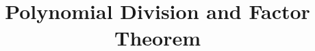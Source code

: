 \documentclass[a4paper,12pt]{article}
\begin{document}

\title{Polynomial Division and Factor Theorem}
\newcommand\event{S.3,4 Elite Mathematics Training}
\newcommand\learningobjective{
\item Learn Polynomial Division, Factor Theorem and Remainder Theorem
\item Learn how to find the GCD between polynomials
}

\myfrontpage





\newpage

\begin{question}[]{3}
    
    
    
    
    
    
    
\end{question}
\end{document}
